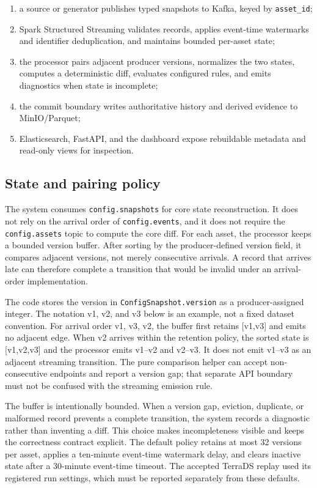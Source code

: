 \documentclass[a4paper,11pt]{article}
\begin{document}
\begin{enumerate}
    \item a source or generator publishes typed snapshots to Kafka, keyed by \texttt{asset\_id};
    \item Spark Structured Streaming validates records, applies event-time watermarks and identifier deduplication, and maintains bounded per-asset state;
    \item the processor pairs adjacent producer versions, normalizes the two states, computes a deterministic diff, evaluates configured rules, and emits diagnostics when state is incomplete;
    \item the commit boundary writes authoritative history and derived evidence to MinIO/Parquet;
    \item Elasticsearch, FastAPI, and the dashboard expose rebuildable metadata and read-only views for inspection.
\end{enumerate}

\subsection{State and pairing policy}

The system consumes \texttt{config.snapshots} for core state reconstruction. It does not rely on the arrival order of \texttt{config.events}, and it does not require the \texttt{config.assets} topic to compute the core diff. For each asset, the processor keeps a bounded version buffer. After sorting by the producer-defined version field, it compares adjacent versions, not merely consecutive arrivals. A record that arrives late can therefore complete a transition that would be invalid under an arrival-order implementation.

The code stores the version in \texttt{ConfigSnapshot.version} as a producer-assigned integer. The notation v1, v2, and v3 below is an example, not a fixed dataset convention. For arrival order v1, v3, v2, the buffer first retains [v1,v3] and emits no adjacent edge. When v2 arrives within the retention policy, the sorted state is [v1,v2,v3] and the processor emits v1--v2 and v2--v3. It does not emit v1--v3 as an adjacent streaming transition. The pure comparison helper can accept non-consecutive endpoints and report a version gap; that separate API boundary must not be confused with the streaming emission rule.

The buffer is intentionally bounded. When a version gap, eviction, duplicate, or malformed record prevents a complete transition, the system records a diagnostic rather than inventing a diff. This choice makes incompleteness visible and keeps the correctness contract explicit. The default policy retains at most 32 versions per asset, applies a ten-minute event-time watermark delay, and clears inactive state after a 30-minute event-time timeout. The accepted TerraDS replay used its registered run settings, which must be reported separately from these defaults.
\end{document}
